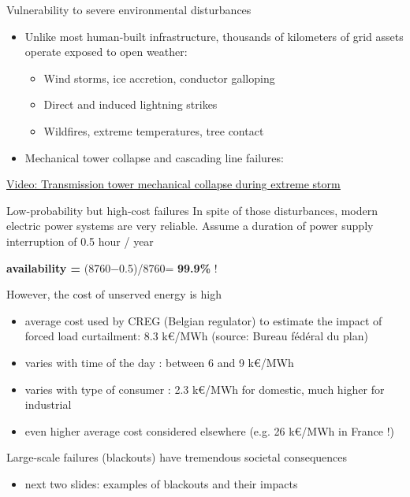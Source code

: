 \begin{frame}
{Vulnerability to severe environmental disturbances}
\begin{itemize}
\item Unlike most human-built infrastructure, thousands of kilometers of grid assets operate exposed to open weather:
  \begin{itemize}
    \item Wind storms, ice accretion, conductor galloping
    \item Direct and induced lightning strikes
    \item Wildfires, extreme temperatures, tree contact
  \end{itemize}
\item Mechanical tower collapse and cascading line failures:
\end{itemize}
\begin{center}
\href{https://www.youtube.com/embed/bSSO5XT1k1I}{\underline{Video: Transmission tower mechanical collapse during extreme storm}}
\end{center}
\end{frame}

\begin{frame}[allowframebreaks]{Low-probability but high-cost failures}
In spite of those disturbances, modern electric power systems are very reliable. Assume a duration of power supply interruption of 0.5 hour / year
\begin{center}
\textbf{availability =} (8760$-$0.5)/8760= \textbf{99.9\%} !
\end{center}
However, the cost of unserved energy is high
\begin{itemize}
\item average cost used by CREG (Belgian regulator) to estimate the impact of forced load curtailment: 8.3 k€/MWh (source: Bureau fédéral du plan)
\item varies with time of the day : between 6 and 9 k€/MWh
\item varies with type of consumer : 2.3 k€/MWh for domestic, much higher for industrial
\item even higher average cost considered elsewhere (e.g. 26 k€/MWh in France !)
\end{itemize}
Large-scale failures (blackouts) have tremendous societal consequences
\begin{itemize}
\item next two slides: examples of blackouts and their impacts
\end{itemize}
\end{frame}

